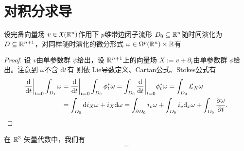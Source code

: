 \section{对积分求导}

\begin{theorem}
    设完备向量场 $v\in\mathfrak X(\mathbb{R}^n)$作用下 $p$维带边闭子流形 $D_0\subseteq\mathbb{R}^n$随时间演化为 $D\subseteq\mathbb{R}^{n+1}$，对同样随时演化的微分形式 $\omega\in\Omega^p(\mathbb{R}^n)\times\mathbb{R}$有 
\end{theorem}
\begin{proof}
    设 $v$由单参数群 $\psi$给出，设 $\mathbb{R}^{n+1}$上的向量场 $X:=v+\partial_t$由单参数群 $\phi$给出。注意到 $\omega$不含 $\dd t$有
    则依 Lie导数定义、Cartan公式、Stokes公式有
    \begin{align*} \dv{t}\bigg|_{t=0}\int_{D_t}\omega&=\dv{t}\bigg|_{t=0}\int_{D_0}\phi_t^*\omega =\int_{D_0}\dv{t}\bigg|_{t=0}\phi_t^*\omega=\int_{D_0}\mathcal L_X\omega\\ &=\int_{D_0}\dd i_X\omega+i_X\dd\omega =\int_{\partial D_0}i_v\omega+\int_{D_0}i_v\dd_x\omega+\int_{D_0}\frac{\partial\omega}{\partial t}.\qedhere \end{align*}
\end{proof}

\begin{eg}
    在 $\mathbb{R}^3$ 矢量代数中，我们有
    \begin{align*}
        =
    \end{align*}
\end{eg}
